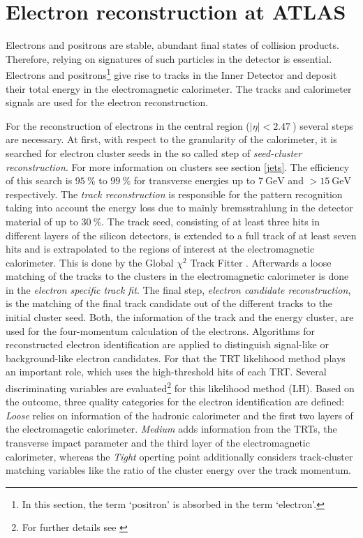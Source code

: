 \section{Electron reconstruction at ATLAS}
Electrons and positrons are stable, abundant final states of collision products. Therefore, relying on signatures of such particles in the detector is essential. Electrons and positrons\footnote{In this section, the term `positron' is absorbed in the term `electron'.} give rise to tracks in the Inner Detector and deposit their total energy in the electromagnetic calorimeter. The tracks and calorimeter signals are used for the electron reconstruction. \cite{ePerformance}\par
For the reconstruction of electrons in the central region ($|\eta|<\SI{2.47}{}$) several steps are necessary. At first, with respect to the granularity of the calorimeter, it is searched for electron cluster seeds in the so called step of \textit{seed-cluster reconstruction}. For more information on clusters see section \ref{jets}. The efficiency of this search is $\SI{95}{\percent}$ to $\SI{99}{\percent}$ for transverse energies up to $\SI{7}{\giga\electronvolt}$ and $>\SI{15}{\giga\electronvolt}$ respectively. The \textit{track reconstruction} is responsible for the pattern recognition taking into account the energy loss due to mainly bremsstrahlung in the detector material of up to $\SI{30}{\percent}$. The track seed, consisting of at least three hits in different layers of the silicon detectors, is extended to a full track of at least seven hits and is extrapolated to the regions of interest at the electromagnetic calorimeter. This is done by the {\ATLAS} Global $\chi^2$ Track Fitter \cite{trackfitter}. Afterwards a loose matching of the tracks to the clusters in the electromagnetic calorimeter is done in the \textit{electron specific track fit}. The final step, \textit{electron candidate reconstruction}, is the matching of the final track candidate out of the different tracks to the initial cluster seed. \cite{ePerformance}\newline
Both, the information of the track and the energy cluster, are used for the four-momentum calculation of the electrons. Algorithms for reconstructed electron identification are applied to distinguish signal-like or background-like electron candidates. For that the TRT likelihood method plays an important role, which uses the high-threshold hits of each TRT. Several discriminating variables are evaluated\footnote{For further details see \cite{ePerformance}} for this likelihood method (LH). Based on the outcome, three quality categories for the electron identification are defined: \textit{Loose} relies on information of the hadronic calorimeter and the first two layers of the electromagetic calorimeter. \textit{Medium} adds information from the TRTs, the transverse impact parameter and the third layer of the electromagnetic calorimeter, whereas the \textit{Tight} operting point additionally considers track-cluster matching variables like the ratio of the cluster energy over the track momentum. \cite{ePerformance}\newline
